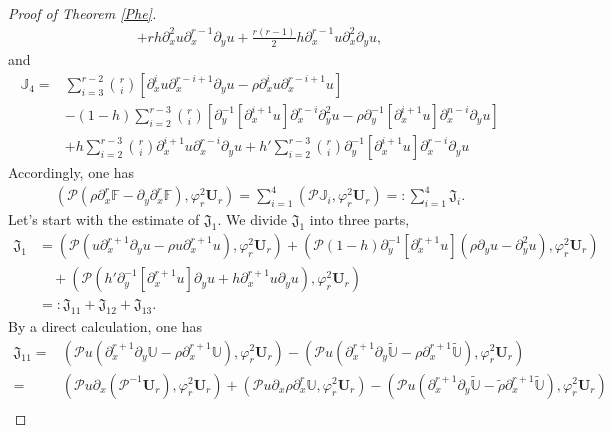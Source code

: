 \documentclass{amsart}
\numberwithin{equation}{section}
\begin{document}
\begin{proof}[Proof of Theorem \ref{Phe}]
\begin{align*}
  +rh\partial_{x}^{2}u\partial_{x}^{r-1}\partial_{y}u
  +\frac{r(r-1)}{2}h\partial_{x}^{r-1}u\partial_{x}^{2}\partial_{y}u,
\end{align*}
and
\begin{align*}
\mathbb{J}_{4}
=& \sum_{i=3}^{r-2}\binom{r}{i}[\partial_{x}^{i}u\partial_{x}^{r-i+1}\partial_{y}u-\rho\partial_{x}^{i}u\partial_{x}^{r-i+1}u]\\
 &-(1-h)\sum_{i=2}^{r-3}\binom{r}{i}\left[\partial_{y}^{-1}[\partial_{x}^{i+1}u]\partial_{x}^{r-i}\partial_{y}^{2}u-\rho\partial_{y}^{-1}[\partial_{x}^{i+1}u]\partial_{x}^{n-i}\partial_{y}u\right]\\
 &+h\sum_{i=2}^{r-3}\binom{r}{i}\partial_{x}^{i+1}u\partial_{x}^{r-i}\partial_{y}u
  +h'\sum_{i=2}^{r-3}\binom{r}{i}\partial_{y}^{-1}[\partial_{x}^{i+1}u]\partial_{x}^{r-i}\partial_{y}u
\end{align*}
Accordingly, one has
\begin{align*}
(\mathcal{P}(\rho\partial_{x}^{r}\mathbb{F}-\partial_{y}\partial_{x}^{r}\mathbb{F}),\varphi_{r}^{2}\mathbf{U}_{r})
= \sum_{i=1}^{4}(\mathcal{P}\mathbb{J}_{i},\varphi_{r}^{2}\mathbf{U}_{r})
=: \sum_{i=1}^{4}\mathfrak{J}_{i}.
\end{align*}
Let's start with the estimate of $\mathfrak{J}_{1}$. We divide $\mathfrak{J}_{1}$ into three parts,
\begin{align*}
\mathfrak{J}_{1}
&= (\mathcal{P}(u\partial_{x}^{r+1}\partial_{y}u-\rho u\partial_{x}^{r+1}u),\varphi_{r}^{2}\mathbf{U}_{r})
  +(\mathcal{P}(1-h)\partial_{y}^{-1}[\partial_{x}^{r+1}u](\rho\partial_{y}u-\partial_{y}^{2}u),\varphi_{r}^{2}\mathbf{U}_{r})\\
&\quad+(\mathcal{P}(h'\partial_{y}^{-1}[\partial_{x}^{r+1}u]\partial_{y}u+h\partial_{x}^{r+1}u\partial_{y}u),\varphi_{r}^{2}\mathbf{U}_{r})\\
&=: \mathfrak{J}_{11}+\mathfrak{J}_{12}+\mathfrak{J}_{13}.
\end{align*}
By a direct calculation, one has
\begin{align}\label{JJ11}
\mathfrak{J}_{11}
=& (\mathcal{P}u(\partial_{x}^{r+1}\partial_{y}\mathbb{U}-\rho \partial_{x}^{r+1}\mathbb{U}),\varphi_{r}^{2}\mathbf{U}_{r})
  -(\mathcal{P}u(\partial_{x}^{r+1}\partial_{y}\tilde{\mathbb{U}}-\rho \partial_{x}^{r+1}\tilde{\mathbb{U}}),\varphi_{r}^{2}\mathbf{U}_{r})\\
=& (\mathcal{P}u\partial_{x}(\mathcal{P}^{-1}\mathbf{U}_{r}),\varphi_{r}^{2}\mathbf{U}_{r})
  +(\mathcal{P}u\partial_{x}\rho\partial_{x}^{r}\mathbb{U},\varphi_{r}^{2}\mathbf{U}_{r})
  -(\mathcal{P}u(\partial_{x}^{r+1}\partial_{y}\tilde{\mathbb{U}}-\tilde{\rho}\partial_{x}^{r+1}\tilde{\mathbb{U}}),\varphi_{r}^{2}\mathbf{U}_{r})\nonumber\\

\end{align}
\end{proof}
\end{document}
